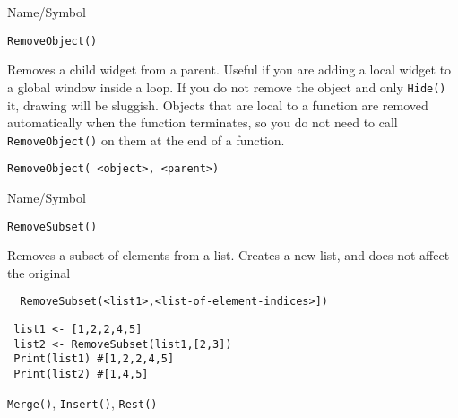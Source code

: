 \begin{desc}{Name/Symbol}
\item[Name/Symbol]	\verb+RemoveObject()+

\item[Description] Removes a child widget from a parent.  Useful if
  you are adding a local widget to a global window inside a loop.  If
  you do not remove the object and only \verb+Hide()+ it, drawing will
  be sluggish.  Objects that are local to a function are removed
  automatically when the function terminates, so you do not need to
  call \verb+RemoveObject()+ on them at the end of a function.

\item[Usage]
\begin{verbatim}
RemoveObject( <object>, <parent>)
\end{verbatim}

\item[Example]	

\item[See Also]	
\end{desc}


\begin{desc}{Name/Symbol}
\item[Name/Symbol]	\verb+RemoveSubset()+

\item[Description] Removes a subset of elements from a list. Creates
a new list, and does not affect the original

\item[Usage]
\begin{verbatim}
  RemoveSubset(<list1>,<list-of-element-indices>])
\end{verbatim}

\item[Example]	
\begin{verbatim}
 list1 <- [1,2,2,4,5]
 list2 <- RemoveSubset(list1,[2,3])
 Print(list1) #[1,2,2,4,5]
 Print(list2) #[1,4,5]
\end{verbatim}

\item[See Also]	
\verb+Merge()+, \verb+Insert()+, \verb+Rest()+
\end{desc}


